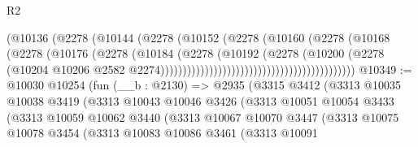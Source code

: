 \begin{lexlean}{R2}
\begin{coremodule}
                                                      (@10136
                                                        (@2278
                                                          (@10144
                                                            (@2278
                                                              (@10152
                                                                (@2278
                                                                  (@10160
                                                                    (@2278
                                                                      (@10168
                                                                        (@2278
                                                                          (@10176
                                                                            (@2278
                                                                              (@10184
                                                                                (@2278
                                                                                  (@10192
                                                                                    (@2278
                                                                                      (@10200
                                                                                        (@2278
                                                                                          (@10204
                                                                                            @10206
                                                                                            @2582
                                                                                            @2274))))))))))))))))))))))))))))))))))))))))))))
@10349 := @10030
    @10254
    (fun (__b : @2130) =>
    @2935
      (@3315
        @3412
        (@3313
          @10035
          @10038
          @3419
          (@3313
            @10043
            @10046
            @3426
            (@3313
              @10051
              @10054
              @3433
              (@3313
                @10059
                @10062
                @3440
                (@3313
                  @10067
                  @10070
                  @3447
                  (@3313
                    @10075
                    @10078
                    @3454
                    (@3313
                      @10083
                      @10086
                      @3461
                      (@3313
                        @10091

\end{coremodule}
\end{lexlean}
